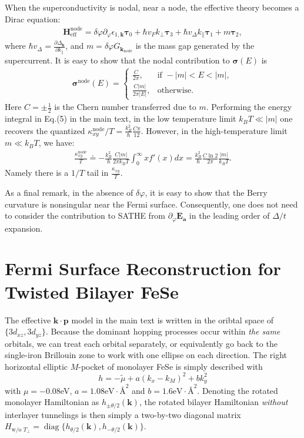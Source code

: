 \begin{subappendices}
When the superconductivity is nodal, near a node, the effective theory becomes a Dirac equation:
\begin{align}
\mathbf H^{\text{node}}_{\text{eff}}=\delta\varphi\partial_\varphi\epsilon_{1,\bm{k}}\boldsymbol\tau_0+\hbar v_F k_\perp\boldsymbol\tau_3+\hbar v_\Delta k_\parallel\boldsymbol\tau_1+m\boldsymbol\tau_2,
\end{align}
where $\hbar v_\Delta =\frac{\partial \varDelta_{\bm{k}}}{\partial k_\parallel}$, and $m=\delta\varphi G_{\bm{k}_{\text{node}}}$ is the mass gap generated by the supercurrent. It is easy to show that the nodal contribution to $\boldsymbol\sigma(E)$ is
\begin{align}
\boldsymbol\sigma^{\text{node}}(E)=\begin{cases}
      \frac{C}{2\pi}, & \text{if } -|m|<E<|m|, \\
      \frac{C |m|}{2\pi|E|}, & \text{otherwise}.
    \end{cases}
\end{align}
Here $C=\pm \frac{1}{2}$ is the Chern number transferred due to $m$. Performing the energy integral in Eq.(5) in the main text, in the low temperature limit $k_BT\ll |m|$ one recovers the quantized $\kappa^{\text{node}}_{xy}/T=\frac{k_B^2}{\hbar}\frac{C\pi}{12}$. However, in the high-temperature limit $m\ll k_B T$, we have:
\begin{align}
\frac{\kappa_{xy}^{\text{node}}}{T}\doteq  -\frac{k_B^2}{\hbar}\frac{C |m|}{2\pi k_BT}\int^{\infty}_{0} x f'(x) dx=\frac{k_B^2}{\hbar}\frac{C \ln 2 }{2\pi}\frac{ |m|  }{k_B T}.
\end{align}
Namely there is a $1/T$ tail in $\frac{\kappa_{xy}}{T}$.

As a final remark, in the absence of $\delta\varphi$, it is easy to show that the Berry curvature is nonsingular near the Fermi surface. Consequently, one does not need to consider the contribution to SATHE from $\partial_\varphi \mathbf E_{\mathbf a}$ in the leading order of $\varDelta/t$ expansion.

\section{Fermi Surface Reconstruction for Twisted Bilayer FeSe}
The effective $\bm{k\cdot p}$ model in the main text is written in the oribtal space of $\{3d_{xz},3d_{yz}\}$. Because the dominant hopping processes occur within \emph{the same} orbitals, we can treat each orbital separately, or equivalently go back to the single-iron Brillouin zone to work with one ellipse on each direction. The right horizontal elliptic $M$-pocket of monolayer FeSe is simply described with
\begin{equation}\label{H_mono_FeSe}
	h=-\widetilde{\mu} + a(k_x-k_M)^2 + bk_y^2
\end{equation}
with $\mu=-0.08$eV, $a=1.08\text{eV}\cdot\text{\AA}^2$ and $b=1.6\text{eV}\cdot\text{\AA}^2$. Denoting the rotated monolayer Hamiltonian as $h_{\pm\theta/2}(\bm{k})$, the rotated bilayer Hamiltonian \emph{without} interlayer tunnelings is then simply a two-by-two diagonal matrix $H_{\text{w/o }T_\perp}=\mathop{\mathrm{diag}}\{h_{\theta/2}(\bm{k}), h_{-\theta/2}(\bm{k})\}$.


\end{subappendices}
